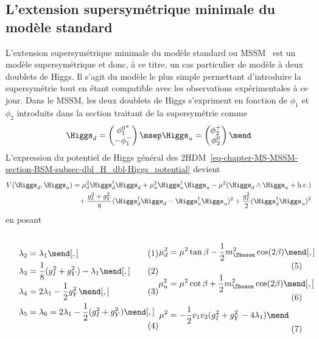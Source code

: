 \subsection{L'extension supersymétrique minimale du modèle standard}\label{chapter-MS-MSSM-section-BSM-subsec-MSSM}
L'extension supersymétrique minimale du modèle standard ou MSSM~\cite{mssm_fayet1,mssm_fayet2}
est un modèle supersymétrique et donc, à ce titre, un cas particulier de modèle à deux doublets de Higgs.
Il s'agit du modèle le plus simple permettant d'introduire la supersymétrie tout en étant compatible avec les observations expérimentales à ce jour.
Dans le MSSM, les deux doublets de Higgs s'expriment en fonction de $\phi_1$ et $\phi_2$ introduits dans la section traitant de la supersymétrie comme~\cite{Higgs_hunter_guide}
\begin{equation}
\Higgs_d
=
\begin{pmatrix}
{\phi_1^0}^* \\ -\phi_1^-
\end{pmatrix}
\msep
\Higgs_u
=
\begin{pmatrix}
\phi_2^+ \\ \phi_2^0
\end{pmatrix}
\mend
\label{eq-chapter-MS-MSSM-section-BSM-Higgs_doublets}
\end{equation}
L'expression du potentiel de Higgs général des 2HDM~\eqref{eq-chapter-MS-MSSM-section-BSM-subsec-dbl_H_dbl-Higgs_potential} devient
\begin{align}
V(\Higgs_d,\Higgs_u)
&
=
\mu_d^2\Higgs_d^\dagger\Higgs_d
+
\mu_u^2\Higgs_u^\dagger\Higgs_u
-
\mu^2 (\Higgs_d\wedge\Higgs_u+\text{h.c.})
\nonumber\\
&\hphantom{=}
+
\frac{g_I^2+g_Y^2}{8} (\Higgs_d^\dagger\Higgs_d-\Higgs_u^\dagger\Higgs_u)^2
+
\frac{g_I^2}{2} (\Higgs_d^\dagger\Higgs_u)^2
\end{align}
en posant~\cite{Higgs_hunter_guide,Higgs_hunter_guide_errata,Nagashima_BSM}
\vspace{-.5\baselineskip}\par\noindent
\begin{subequations}
\noindent
\begin{minipage}[c]{.49\textwidth}
\begin{align}
\lambda_2 &= \lambda_1 \mend[,]\\
\lambda_3 &= \frac{1}{8} (g_I^2+g_Y^2)-\lambda_1 \mend[,]\\
\lambda_4 &= 2\lambda_1 - \frac{1}{2} g_Y^2 \mend[,]\\
\lambda_5 &= \lambda_6 = 2\lambda_1 - \frac{1}{2}(g_I^2+g_Y^2) \mend[,]
\end{align}
\end{minipage}
\hfill
\begin{minipage}[c]{.49\textwidth}
\begin{align}
\mu_d^2 &= \mu^2\tan\beta - \frac{1}{2} m_{\Zboson}^2 \cos(2\beta) \mend[,]\\
\mu_u^2 &= \mu^2\cot\beta + \frac{1}{2} m_{\Zboson}^2 \cos(2\beta) \mend[,]\\
\mu^2 &= -\frac{1}{2}v_1v_2(g_I^2+g_Y^2-4\lambda_1)
\mend
\end{align}
\end{minipage}
\end{subequations}
